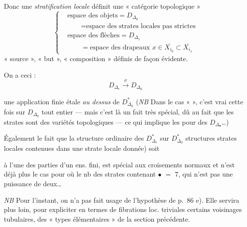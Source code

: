 \documentclass[11pt,a4paper]{article}
\begin{document}
Donc une \emph{stratification locale} définit une « catégorie topologique »
\[
  \left\{
  \begin{aligned}
    &\text{espace des objets} = D_{\Delta_0} \\
    &\qquad = \text{espace des strates locales pas strictes} \\
    &\text{espace des flèches} = D_{\Delta_1} \\
    &\qquad = \text{espace des drapeaux } x \in \overline{X_{i_0}} \subset \overline{X_{i_1}}
  \end{aligned}
  \right. \tag{303}
\]
 « source », « but », « composition » définis de façon évidente.



On a ceci :
\[
  D_{\Delta_r} \xrightarrow{\ \sigma\ } D_{\Delta_0} \tag{304}
\]


 une application finie étale \emph{au dessus} de $D^{*}_{\Delta_0}$ (\emph{NB} Dans le cas « \ill{} \ill{} », c'est \ill{} vrai \ill{} cette fois sur $D_{\Delta_0}$ tout entier --- mais c'est là un fait très spécial, dû au fait que les \struck{\ill{}} strates sont des variétés topologiques --- ce qui implique les \ill{} pour \ill{} \ill{} des $D_{\Delta_\bullet}$…)

Également le fait que \struck{\ill{}} la structure  ordinaire  des $D^{*}_{\Delta_r}$ sur $D^{*}_{\Delta_0}$  structures  strates locales contenues dans une strate locale donnée) soit \struck{\ill{}} \add{\ill{}} 

à l'une des parties d'un ens. fini, est spécial aux croisements normaux et n'est déjà plus le cas pour
où le nb des strates contenant $\bullet$ \ill{} \ill{} $=$ \struck{\ill{}} $7$, qui n'est pas une puissance de deux…

\emph{NB} Pour l'instant, on n'a pas  fait usage de l'hypothèse  de p.~86 e). Elle servira plus loin, pour expliciter en termes de fibrations loc. triviales certains voisinages tubulaires, \struck{\ill{}}  des « types élémentaires » de la section précédente.

\end{document}
